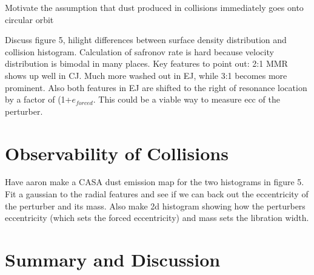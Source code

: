 \documentclass[twocolumn]{aastex63}
\begin{document}
Motivate the assumption that dust produced in collisions immediately goes onto circular orbit

Discuss figure 5, hilight differences between surface density distribution and collision histogram. Calculation of safronov rate is hard because velocity distribution is bimodal in many places. Key features to point out: 2:1 MMR shows up well in CJ. Much more washed out in EJ, while 3:1 becomes more prominent. Also both features in EJ are shifted to the right of resonance location by a factor of (1+$e_{forced}$. This could be a viable way to measure ecc of the perturber.

\section{Observability of Collisions} \label{sec:dust}

Have aaron make a CASA dust emission map for the two histograms in figure 5. Fit a gaussian to the radial features and see if we can back out the eccentricity of the perturber and its mass. Also make 2d histogram showing how the perturbers eccentricity (which sets the forced eccentricity) and mass sets the libration width.

\section{Summary and Discussion} \label{sec:discuss}


\end{document}

